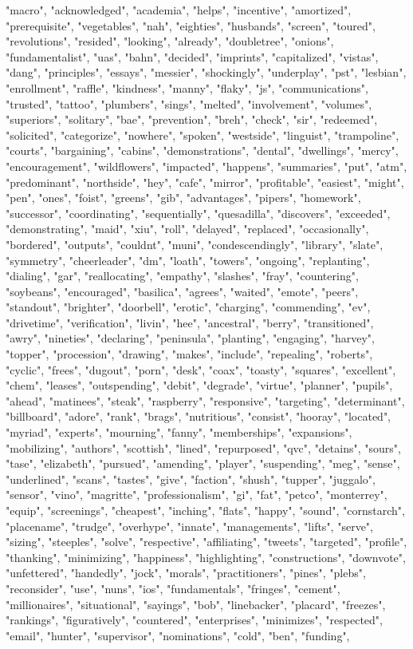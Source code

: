 "macro", "acknowledged", "academia", "helps", "incentive", "amortized", "prerequisite", "vegetables", "nah", "eighties", "husbands", "screen", "toured", "revolutions", "resided", "looking", "already", "doubletree", "onions", "fundamentalist", "uas", "bahn", "decided", "imprints", "capitalized", "vistas", "dang", "principles", "essays", "messier", "shockingly", "underplay", "pst", "lesbian", "enrollment", "raffle", "kindness", "manny", "flaky", "js", "communications", "trusted", "tattoo", "plumbers", "sings", "melted", "involvement", "volumes", "superiors", "solitary", "bae", "prevention", "breh", "check", "sir", "redeemed", "solicited", "categorize", "nowhere", "spoken", "westside", "linguist", "trampoline", "courts", "bargaining", "cabins", "demonstrations", "dental", "dwellings", "mercy", "encouragement", "wildflowers", "impacted", "happens", "summaries", "put", "atm", "predominant", "northside", "hey", "cafe", "mirror", "profitable", "easiest", "might", "pen", "ones", "foist", "greens", "gib", "advantages", "pipers", "homework", "successor", "coordinating", "sequentially", "quesadilla", "discovers", "exceeded", "demonstrating", "maid", "xiu", "roll", "delayed", "replaced", "occasionally", "bordered", "outputs", "couldnt", "muni", "condescendingly", "library", "slate", "symmetry", "cheerleader", "dm", "loath", "towers", "ongoing", "replanting", "dialing", "gar", "reallocating", "empathy", "slashes", "fray", "countering", "soybeans", "encouraged", "basilica", "agrees", "waited", "emote", "peers", "standout", "brighter", "doorbell", "erotic", "charging", "commending", "ev", "drivetime", "verification", "livin", "hee", "ancestral", "berry", "transitioned", "awry", "nineties", "declaring", "peninsula", "planting", "engaging", "harvey", "topper", "procession", "drawing", "makes", "include", "repealing", "roberts", "cyclic", "frees", "dugout", "porn", "desk", "coax", "toasty", "squares", "excellent", "chem", "leases", "outspending", "debit", "degrade", "virtue", "planner", "pupils", "ahead", "matinees", "steak", "raspberry", "responsive", "targeting", "determinant", "billboard", "adore", "rank", "brags", "nutritious", "consist", "hooray", "located", "myriad", "experts", "mourning", "fanny", "memberships", "expansions", "mobilizing", "authors", "scottish", "lined", "repurposed", "qvc", "detains", "sours", "tase", "elizabeth", "pursued", "amending", "player", "suspending", "meg", "sense", "underlined", "scans", "tastes", "give", "faction", "shush", "tupper", "juggalo", "sensor", "vino", "magritte", "professionalism", "gi", "fat", "petco", "monterrey", "equip", "screenings", "cheapest", "inching", "flats", "happy", "sound", "cornstarch", "placename", "trudge", "overhype", "innate", "managements", "lifts", "serve", "sizing", "steeples", "solve", "respective", "affiliating", "tweets", "targeted", "profile", "thanking", "minimizing", "happiness", "highlighting", "constructions", "downvote", "unfettered", "handedly", "jock", "morals", "practitioners", "pines", "plebs", "reconsider", "use", "nuns", "ios", "fundamentals", "fringes", "cement", "millionaires", "situational", "sayings", "bob", "linebacker", "placard", "freezes", "rankings", "figuratively", "countered", "enterprises", "minimizes", "respected", "email", "hunter", "supervisor", "nominations", "cold", "ben", "funding", 